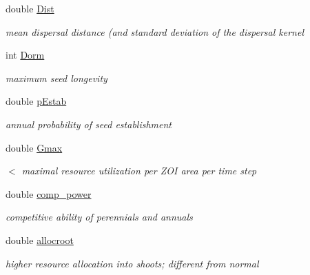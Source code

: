 \begin{DoxyCompactItemize}
double \mbox{\hyperlink{class_s_pft_traits_adcfae284d5d7d0ca0f4be2190c659966}{Dist}}
\begin{DoxyCompactList}\small\item\em mean dispersal distance (and standard deviation of the dispersal kernel \end{DoxyCompactList}\item 
\mbox{\label{class_s_pft_traits_af8664396e4d5dd27f444fe114988e0e3}} 
int \mbox{\hyperlink{class_s_pft_traits_af8664396e4d5dd27f444fe114988e0e3}{Dorm}}
\begin{DoxyCompactList}\small\item\em maximum seed longevity \end{DoxyCompactList}\item 
\mbox{\label{class_s_pft_traits_a67a3dd8f5ad81dfd21d6a0f65e1016a9}} 
double \mbox{\hyperlink{class_s_pft_traits_a67a3dd8f5ad81dfd21d6a0f65e1016a9}{p\+Estab}}
\begin{DoxyCompactList}\small\item\em annual probability of seed establishment \end{DoxyCompactList}\item 
double \mbox{\hyperlink{class_s_pft_traits_a2696ba31c6746b189f57c218b06e5549}{Gmax}}
\begin{DoxyCompactList}\small\item\em $<$ maximal resource utilization per Z\+OI area per time step \end{DoxyCompactList}\item 
\mbox{\label{class_s_pft_traits_aa0f84234647835b7a4e93dc0b8a144bf}} 
double \mbox{\hyperlink{class_s_pft_traits_aa0f84234647835b7a4e93dc0b8a144bf}{comp\+\_\+power}}
\begin{DoxyCompactList}\small\item\em competitive ability of perennials and annuals \end{DoxyCompactList}\item 
\mbox{\label{class_s_pft_traits_a2c17d7aa3fa389a95a78563acca445df}} 
double \mbox{\hyperlink{class_s_pft_traits_a2c17d7aa3fa389a95a78563acca445df}{allocroot}}
\begin{DoxyCompactList}\small\item\em higher resource allocation into shoots; different from normal \end{DoxyCompactList}\item 

\end{DoxyCompactItemize}
